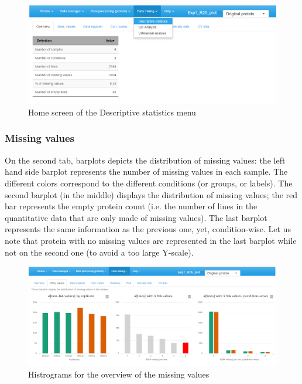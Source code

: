 \documentclass[12pt]{article}
\begin{document}
\begin {figure}
\includegraphics[width=\textwidth]{images/descstat-overview.png}
\caption{Home screen of the Descriptive statistics menu}\label{fig:sdov}
\end {figure}

\subsubsection{Missing values}

On the second tab, barplots depicts the distribution of missing values: the left hand side barplot represents the number of missing values in each sample. The different colors correspond to the different conditions (or groups, or labels). The second barplot (in the middle) displays the distribution of missing values; the red bar represents the empty protein count (i.e. the number of lines in the quantitative data that are only made of missing values). The last barplot represents the same information as the previous one, yet, condition-wise. Let us note that protein with no missing values are represented in the last barplot while not on the second one (to avoid a too large Y-scale).

\begin {figure}
\includegraphics[width=\textwidth]{images/desc_missValues.png}
\caption{Histrograms for the overview of the missing values}\label{fig:sdmv}
\end {figure}
\end{document}
